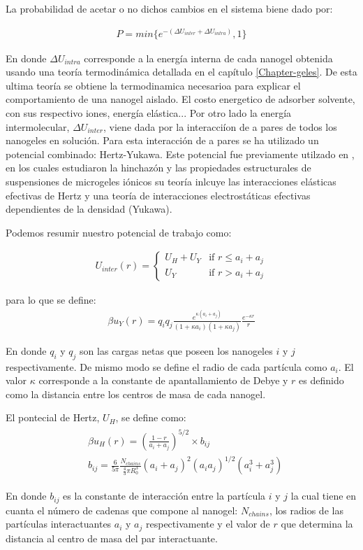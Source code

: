 La probabilidad de acetar o no dichos cambios en el sistema biene dado por:

\begin{align}
	P = min \{e^{-(\Delta U_{inter} + \Delta U_{intra})},1\}
\end{align}

En donde $\Delta U_{intra}$ corresponde a la energ\'ia interna de cada nanogel obtenida usando una teor\'ia termodin\'amica detallada en el cap\'itulo  \ref{Chapter-geles}. De esta ultima teor\'ia se obtiene la termodinamica necesarioa para explicar el comportamiento de una nanogel aislado.
El costo energetico de adsorber solvente, con sus respectivo iones, energ\'ia el\'astica... 
Por otro lado la energ\'ia intermolecular, $\Delta U_{inter}$, viene dada por la interacci\'ion de a pares de todos los nanogeles en soluci\'on. 
Para esta interacci\'on de a pares se ha utilizado un potencial combinado: Hertz-Yukawa. Este potencial fue previamente utilzado en , en los cuales  
estudiaron la hinchaz\'on y las propiedades estructurales de suspensiones de microgeles i\'onicos su teor\'ia inlcuye las interacciones el\'asticas efectivas de Hertz y una teor\'ia de interacciones electrost\'aticas efectivas dependientes de la densidad (Yukawa). 

Podemos resumir nuestro potencial de trabajo como:

\begin{align}
	U_{inter}(r) = \begin{cases} U_H + U_Y & \text{if } r \leq a_i + a_j \\ U_Y & \text{if } r > a_i + a_j \end{cases} 
	\label{eq:HY-potential}
\end{align}

para lo que se define:
\begin{align}
	\beta u_Y(r) = q_i q_j \frac{e^{\kappa(a_i + a_j)}}{(1 +\kappa a_i)(1 + \kappa a_j)} \frac{e^{-\kappa r}}{r} 
	\label{eq:yukawa}
\end{align}

En donde $q_i$ y $q_j$ son las cargas netas que poseen los nanogeles $i$ y $j$ respectivamente. De mismo modo se define el radio de cada part\'icula como $a_i$. El valor $\kappa$ corresponde a la constante de apantallamiento de Debye y $r$ es definido como la distancia entre los centros de masa de cada nanogel.

El pontecial de Hertz, $U_H$, se define como:
\begin{align}
	\begin{aligned}
		& \beta u_H (r) = \left(\frac{1-r}{a_i + a_j}\right)^{5/2}\times b_{ij} \\
		& b_{ij} = \frac{6}{5\pi}\frac{N_{chains}}{\frac{4}{3}\pi R_0^3}(a_i + a_j)^2(a_ia_j)^{1/2}(a_i^3 + a_j^3) 
	\end{aligned}
\end{align}

En donde $b_{ij}$ es la constante de interacci\'on entre la part\'icula $i$ y $j$ la cual tiene en cuanta el n\'umero de cadenas que compone al nanogel: $N_{chains}$, los radios de las part\'iculas interactuantes $a_i$ y $a_j$ respectivamente y el valor de $r$ que determina la distancia al centro de masa del par interactuante. 